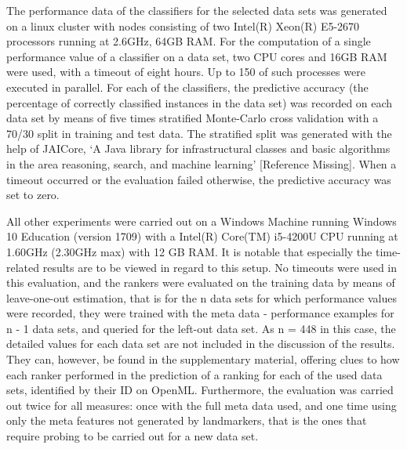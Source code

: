 
The performance data of the classifiers for the selected data sets was generated on a linux cluster with nodes consisting of two Intel(R) Xeon(R) E5-2670 processors running at 2.6GHz, 64GB RAM. For the computation of a single performance value of a classifier on a data set, two CPU cores and 16GB RAM were used, with a timeout of eight hours. Up to 150 of such processes were executed in parallel. For each of the classifiers, the predictive accuracy (the percentage of correctly classified instances in the data set) was recorded on each data set by means of five times stratified Monte-Carlo cross validation with a 70/30 split in training and test data. The stratified split was generated with the help of JAICore, `A Java library for infrastructural classes and basic algorithms in the area reasoning, search, and machine learning' [Reference Missing]. When a timeout occurred or the evaluation failed otherwise, the predictive accuracy was set to zero.

All other experiments were carried out on a Windows Machine running Windows 10 Education (version 1709) with a Intel(R) Core(TM) i5-4200U CPU running at 1.60GHz (2.30GHz max) with 12 GB RAM. It is notable that especially the time-related results are to be viewed in regard to this setup. No timeouts were used in this evaluation, and the rankers were evaluated on the training data by means of leave-one-out estimation, that is for the n data sets for which performance values were recorded, they were trained with the meta data - performance examples for n - 1 data sets, and queried for the left-out data set. As n = 448 in this case, the detailed values for each data set are not included in the discussion of the results. They can, however, be found in the supplementary material, offering clues to how each ranker performed in the prediction of a ranking for each of the used data sets, identified by their ID on OpenML. Furthermore, the evaluation was carried out twice for all measures: once with the full meta data used, and one time using only the meta features not generated by landmarkers, that is the ones that require probing to be carried out for a new data set.

